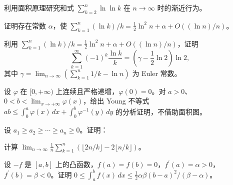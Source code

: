 \newpage
\noindent\begin{minipage}{\textwidth}
利用面积原理研究和式 $\sum_{k=2}^n\ln\ln k$ 在 $n\to\infty$ 时的渐近行为。
\end{minipage}\par\vfill
\noindent\begin{minipage}{\textwidth}
证明存在常数 $\alpha$，使 $\sum_{k=1}^n(\ln k)/k=\frac12\ln^2n+\alpha+O((\ln n)/n)$。
\end{minipage}\par\vfill
\noindent\begin{minipage}{\textwidth}
利用 $\sum_{k=1}^n(\ln k)/k=\frac12\ln^2n+\alpha+O((\ln n)/n)$，证明\[\sum_{k=1}^{\infty}(-1)^k\frac{\ln k}{k}=\left(\gamma-\frac12\ln2\right)\ln2,\]其中 $\gamma=\lim_{n\to\infty}(\sum_{k=1}^n1/k-\ln n)$ 为 Euler 常数。
\end{minipage}\par\vfill
\newpage
\noindent\begin{minipage}{\textwidth}
设 $\varphi$ 在 $[0,+\infty)$ 上连续且严格递增，$\varphi(0)=0$。对 $a>0$、$0<b<\lim_{x\to+\infty}\varphi(x)$，给出 Young 不等式 $ab\le\int_0^a\varphi(x)\,dx+\int_0^b\varphi^{-1}(y)\,dy$ 的分析证明，不借助面积图。
\end{minipage}\par\vfill
\noindent\begin{minipage}{\textwidth}
设 $a_1\ge a_2\ge\cdots\ge a_n\ge0$。证明：
\end{minipage}\par\vfill
\noindent\begin{minipage}{\textwidth}
计算 $\lim_{n\to\infty}\frac1n\sum_{k=1}^n(\lfloor2n/k\rfloor-2\lfloor n/k\rfloor)$。
\end{minipage}\par\vfill
\newpage
\noindent\begin{minipage}{\textwidth}
设 $-f$ 是 $[a,b]$ 上的凸函数，$f(a)=f(b)=0$，$f^{\prime}(a)=\alpha>0$，$f^{\prime}(b)=\beta<0$。证明 $0\le\int_a^b f(x)\,dx\le\frac12\alpha\beta(b-a)^2/(\beta-\alpha)$。
\end{minipage}\par\vfill
